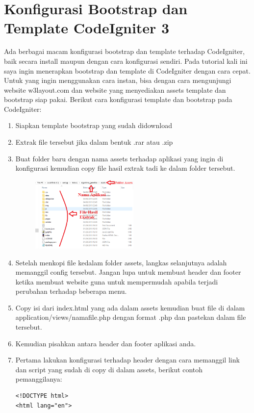 \section{Konfigurasi Bootstrap dan Template CodeIgniter 3}
Ada berbagai macam konfigurasi bootstrap dan template terhadap CodeIgniter, baik secara install maupun dengan cara konfigurasi sendiri. Pada tutorial kali ini saya ingin menerapkan bootstrap dan template di CodeIgniter dengan cara cepat. Untuk yang ingin menggunakan cara instan, bisa dengan cara mengunjungi website w3layout.com dan website yang menyediakan assets template dan bootstrap siap pakai. Berikut cara konfigurasi template dan bootstrap pada CodeIgniter:
\begin{enumerate}
    \item Siapkan template bootstrap yang sudah didownload
    \item Extrak file tersebut jika dalam bentuk .rar atau .zip
    \item Buat folder baru dengan nama assets terhadap aplikasi yang ingin di konfigurasi kemudian copy file hasil extrak tadi ke dalam folder tersebut.
		\begin{figure}[!htbp]
    		\centering
    		\includegraphics[width=0.5\textwidth]{figures/TBCI1.png}
    		\label{TBCI1}
		\end{figure}
		
	\item Setelah menkopi file kedalam folder assets, langkas selanjutnya adalah memanggil config tersebut. Jangan lupa untuk membuat header dan footer ketika membuat website guna untuk mempermudah apabila terjadi perubahan terhadap beberapa menu.
	\item Copy isi dari index.html yang ada dalam assets kemudian buat file di dalam application/views/namafile.php dengan format .php dan pastekan dalam file tersebut.
	\item Kemudian pisahkan antara header dan footer aplikasi anda.
	\item Pertama lakukan konfigurasi terhadap header dengan cara memanggil link dan script yang sudah di copy di dalam assets, berikut contoh pemanggilanya:
\begin{lstlisting}
<!DOCTYPE html>
<html lang="en">


\end{lstlisting}
\end{enumerate}
